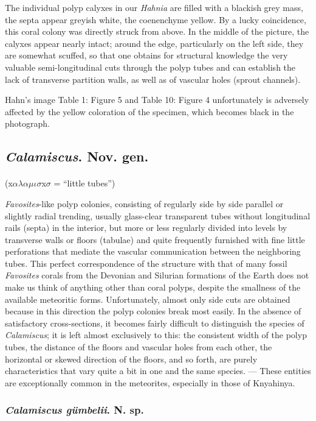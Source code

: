 \documentclass[a4paper, 12pt, oneside]{article}
\begin{document}
The individual polyp calyxes in our \emph{Hahnia} are filled with a blackish grey mass, the septa appear greyish white, the coenenchyme yellow. By a lucky coincidence, this coral colony was directly struck from above. In the middle of the picture, the calyxes appear nearly intact; around the edge, particularly on the left side, they are somewhat scuffed, so that one obtains for structural knowledge the very valuable semi-longitudinal cuts through the polyp tubes and can establish the lack of transverse partition walls, as well as of vascular holes (sprout channels).

Hahn's image Table 1: Figure 5 and Table 10: Figure 4 unfortunately is adversely affected by the yellow coloration of the specimen, which becomes black in the photograph.
\subsection{\emph{Calamiscus}. Nov. gen.}
\paragraph{}
(x$\alpha\lambda\alpha\mu\iota\sigma$x$\sigma$ = ``little tubes'')%

\emph{Favosites}-like polyp colonies, consisting of regularly side by side parallel or slightly radial trending, usually glass-clear transparent tubes without longitudinal rails (septa) in the interior, but more or less regularly divided into levels by transverse walls or floors (tabulae) and quite frequently furnished with fine little perforations that mediate the vascular communication between the neighboring tubes. This perfect correspondence of the structure with that of many fossil \emph{Favosites} corals from the Devonian and Silurian formations of the Earth does not make us think of anything other than coral polyps, despite the smallness of the available meteoritic forms. Unfortunately, almost only side cuts are obtained because in this direction the polyp colonies break most easily. In the absence of satisfactory cross-sections, it becomes fairly difficult to distinguish the species of \emph{Calamiscus}; it is left almost exclusively to this: the consistent width of the polyp tubes, the distance of the floors and vascular holes from each other, the horizontal or skewed direction of the floors, and so forth, are purely characteristics that vary quite a bit in one and the same species. --- These entities are exceptionally common in the meteorites, especially in those of Knyahinya.
\subsubsection{\emph{Calamiscus gümbelii}. N. sp.}
\end{document}
